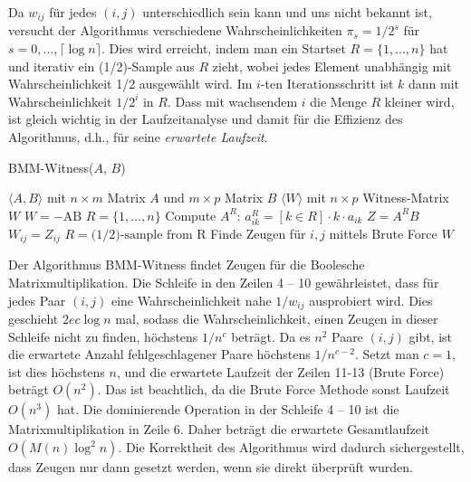 \documentclass{scrartcl}
\numberwithin{equation}{section}
\begin{document}
Da $w_{ij}$ für jedes $(i, j)$ unterschiedlich sein kann und uns nicht bekannt ist, versucht der Algorithmus verschiedene Wahrscheinlichkeiten $\pi_s = 1/2^s$ für $s = 0, \ldots, \lceil \log n \rceil$. Dies wird erreicht, indem man ein Startset $R = \{1, \ldots, n\}$ hat und iterativ ein (1/2)-Sample aus $R$ zieht, wobei jedes Element unabhängig mit Wahrscheinlichkeit 1/2 ausgewählt wird. Im $i$-ten Iterationsschritt ist $k$ dann mit Wahrscheinlichkeit $1/2^i$ in $R$. Dass mit wachsendem $i$ die Menge $R$ kleiner wird, ist  gleich wichtig in der Laufzeitanalyse und damit für die Effizienz des Algorithmus, d.h., für seine \textit{erwartete Laufzeit}.
\begin{algorithm}
	\caption{BMM-Witness($A$, $B$)}
	\label{alg:bmm_witness_rand}
	\begin{algorithmic}[1]
		\Require $\langle A, B \rangle$ mit $n \times m$ Matrix $A$ und $m \times p$ Matrix $B$
		\Ensure $\langle W \rangle$ mit $n \times p$ Witness-Matrix $W$
		\State $W = -\text{AB}$ 
		\State $R = \{1, \ldots, n\}$
		\State Compute $A^R$: $a_{ik}^R = [k \in R] \cdot k \cdot a_{ik}$ 
		\State $Z = A^R B$
		 
		\State $W_{ij} = Z_{ij}$
		\EndIf
		\EndFor
		\State $R = \text{(1/2)-sample from R}$
		\EndFor
		\EndFor
		\State Finde Zeugen für $i, j$ mittels Brute Force 
		\EndIf
		\EndFor
		\State \Return $W$
	\end{algorithmic}
\end{algorithm}
Der Algorithmus BMM-Witness findet Zeugen für die Boolesche Matrixmultiplikation. Die Schleife in den Zeilen 4 -- 10 gewährleistet, dass für jedes Paar $(i, j)$ eine Wahrscheinlichkeit nahe $1/w_{ij}$ ausprobiert wird. Dies geschieht $2ec \log n$ mal, sodass die Wahrscheinlichkeit, einen Zeugen in dieser Schleife nicht zu finden, höchstens $1/n^c$ beträgt. Da es $n^2$ Paare $(i, j)$ gibt, ist die erwartete Anzahl fehlgeschlagener Paare höchstens $1/n^{c-2}$. Setzt man $c=1$, ist dies höchstens $n$, und die erwartete Laufzeit der Zeilen 11-13 (Brute Force) beträgt $O(n^2)$. Das ist beachtlich, da die Brute Force Methode sonst Laufzeit $O(n^3)$ hat. Die dominierende Operation in der Schleife 4 -- 10 ist die Matrixmultiplikation in Zeile 6. Daher beträgt die erwartete Gesamtlaufzeit $O(M(n) \log^2 n)$. Die Korrektheit des Algorithmus wird dadurch sichergestellt, dass Zeugen nur dann gesetzt werden, wenn sie direkt überprüft wurden.
\end{document}
